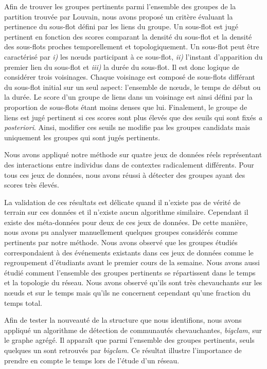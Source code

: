 Afin de trouver les groupes pertinents parmi l'ensemble des groupes de la partition trouvée par Louvain, nous avons proposé un critère évaluant la pertinence du sous-flot défini par les liens du groupe.
Un sous-flot est jugé pertinent en fonction des scores comparant la densité du sous-flot et la densité des sous-flots proches temporellement et topologiquement.
Un sous-flot peut être caractérisé par \emph{i)} les n\oe{}uds participant à ce sous-flot, \emph{ii)} l'instant d'apparition du premier lien du sous-flot et \emph{iii)} la durée du sous-flot.
Il est donc logique de considérer trois voisinages.
Chaque voisinage est composé de sous-flots différant du sous-flot initial sur un seul aspect: l'ensemble de n\oe{}uds, le temps de début ou la durée.
Le score d'un groupe de liens dans un voisinage est ainsi défini par la proportion de sous-flots étant moins denses que lui.
Finalement, le groupe de liens est jugé pertinent si ces scores sont plus élevés que des seuils qui sont fixés \emph{a posteriori}.
Ainsi, modifier ces seuils ne modifie pas les groupes candidats mais uniquement les groupes qui sont jugés pertinents.


Nous avons appliqué notre méthode sur quatre jeux de données réels représentant des interactions entre individus dans de contextes radicalement différents.
Pour tous ces jeux de données, nous avons réussi à détecter des groupes ayant des scores très élevés.

La validation de ces résultats est délicate quand il n'existe pas de vérité de terrain sur ces données et il n'existe aucun algorithme similaire.
Cependant il existe des méta-données pour deux de ces jeux de données.
De cette manière, nous avons pu analyser manuellement quelques groupes considérés comme pertinents par notre méthode.
Nous avons observé que les groupes étudiés correspondaient à des événements existants dans ces jeux de données comme le regroupement d'étudiants avant le premier cours de la semaine.
Nous avons aussi étudié comment l'ensemble des groupes pertinents se répartissent dans le temps et la topologie du réseau.
Nous avons observé qu'ils sont très chevauchants sur les n\oe{}uds et sur le temps mais qu'ils ne concernent cependant qu'une fraction du temps total.


Afin de tester la nouveauté de la structure que nous identifions, nous avons appliqué un algorithme de détection de communautés chevauchantes, \emph{bigclam}, sur le graphe agrégé.
Il apparaît que parmi l'ensemble des groupes pertinents, seuls quelques un sont retrouvés par \emph{bigclam}.
Ce résultat illustre l'importance de prendre en compte le temps lors de l'étude d'un réseau.



